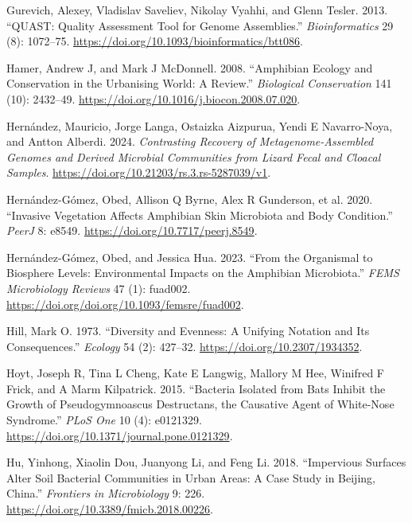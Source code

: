 \documentclass[
  12pt,
]{article}
\newlength{\cslhangindent}
\newenvironment{CSLReferences}[2] %
 {\begin{list}{}{%
  \setlength{\itemindent}{0pt}
  \setlength{\leftmargin}{0pt}
  \setlength{\parsep}{0pt}
  \ifodd #1
   \setlength{\leftmargin}{\cslhangindent}
   \setlength{\itemindent}{-1\cslhangindent}
  \fi
  \setlength{\itemsep}{#2\baselineskip}}}
 {\end{list}}
\begin{document}
\begin{CSLReferences}{1}{1}
Gurevich, Alexey, Vladislav Saveliev, Nikolay Vyahhi, and Glenn Tesler.
2013. {``{QUAST}: Quality Assessment Tool for Genome Assemblies.''}
\emph{Bioinformatics} 29 (8): 1072--75.
\url{https://doi.org/10.1093/bioinformatics/btt086}.

Hamer, Andrew J, and Mark J McDonnell. 2008. {``Amphibian Ecology and
Conservation in the Urbanising World: A Review.''} \emph{Biological
Conservation} 141 (10): 2432--49.
\url{https://doi.org/10.1016/j.biocon.2008.07.020}.

Hernández, Mauricio, Jorge Langa, Ostaizka Aizpurua, Yendi E
Navarro-Noya, and Antton Alberdi. 2024. \emph{Contrasting Recovery of
Metagenome-Assembled Genomes and Derived Microbial Communities from
Lizard Fecal and Cloacal Samples}.
\url{https://doi.org/10.21203/rs.3.rs-5287039/v1}.

Hernández-Gómez, Obed, Allison Q Byrne, Alex R Gunderson, et al. 2020.
{``Invasive Vegetation Affects Amphibian Skin Microbiota and Body
Condition.''} \emph{PeerJ} 8: e8549.
\url{https://doi.org/10.7717/peerj.8549}.

Hernández-Gómez, Obed, and Jessica Hua. 2023. {``From the Organismal to
Biosphere Levels: Environmental Impacts on the Amphibian Microbiota.''}
\emph{FEMS Microbiology Reviews} 47 (1): fuad002.
\url{https://doi.org/doi.org/10.1093/femsre/fuad002}.

Hill, Mark O. 1973. {``Diversity and Evenness: A Unifying Notation and
Its Consequences.''} \emph{Ecology} 54 (2): 427--32.
\url{https://doi.org/10.2307/1934352}.

Hoyt, Joseph R, Tina L Cheng, Kate E Langwig, Mallory M Hee, Winifred F
Frick, and A Marm Kilpatrick. 2015. {``Bacteria Isolated from Bats
Inhibit the Growth of {Pseudogymnoascus} Destructans, the Causative
Agent of White-Nose Syndrome.''} \emph{PLoS One} 10 (4): e0121329.
\url{https://doi.org/10.1371/journal.pone.0121329}.

Hu, Yinhong, Xiaolin Dou, Juanyong Li, and Feng Li. 2018. {``Impervious
Surfaces Alter Soil Bacterial Communities in Urban Areas: A Case Study
in {Beijing}, {China}.''} \emph{Frontiers in Microbiology} 9: 226.
\url{https://doi.org/10.3389/fmicb.2018.00226}.


\end{CSLReferences}
\end{document}
